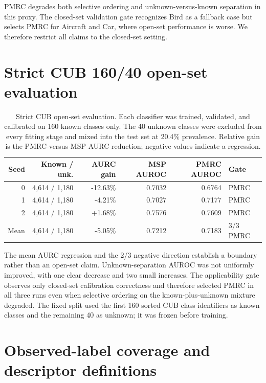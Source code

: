 \documentclass[11pt,a4paper]{article}
\begin{document}
PMRC degrades both selective ordering and unknown-versus-known separation in
this proxy. The closed-set validation gate recognizes Bird as a fallback case
but selects PMRC for Aircraft and Car, where open-set performance is worse. We
therefore restrict all claims to the closed-set setting.

\section{Strict CUB 160/40 open-set evaluation}

\begin{table}[H]
\centering
\caption{Strict CUB open-set evaluation. Each classifier was trained,
validated, and calibrated on 160 known classes only. The 40 unknown classes
were excluded from every fitting stage and mixed into the test set at 20.4\%
prevalence. Relative gain is the PMRC-versus-MSP AURC reduction; negative
values indicate a regression.}
\label{tab:openset-cub}
\small
\begin{tabular}{@{}rrrrrl@{}}
\toprule
Seed & Known / unk. & AURC gain & MSP AUROC & PMRC AUROC & Gate \\
\midrule
0 & 4,614 / 1,180 & -12.63\% & 0.7032 & 0.6764 & PMRC \\
1 & 4,614 / 1,180 & -4.21\% & 0.7027 & 0.7177 & PMRC \\
2 & 4,614 / 1,180 & +1.68\% & 0.7576 & 0.7609 & PMRC \\
Mean & 4,614 / 1,180 & -5.05\% & 0.7212 & 0.7183 & 3/3 PMRC \\
\bottomrule
\end{tabular}
\end{table}

The mean AURC regression and the 2/3 negative direction establish a boundary
rather than an open-set claim. Unknown-separation AUROC was not uniformly
improved, with one
clear decrease and two small increases. The applicability gate observes only
closed-set calibration correctness and therefore selected PMRC in all three
runs even when selective ordering on the known-plus-unknown mixture degraded.
The fixed split used the first 160 sorted CUB class identifiers as known
classes and the remaining 40 as unknown; it was frozen before training.

\section{Observed-label coverage and descriptor definitions}
\end{document}
